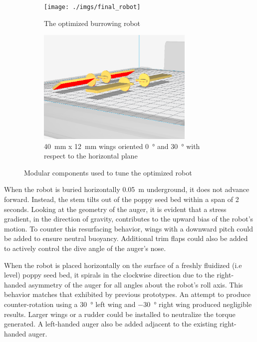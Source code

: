 \documentclass[letterpaper, 11 pt]{article}
\begin{document}
\begin{figure}[H]
\centering
\begin{subfigure}{.5\textwidth}
	\centering
	\texttt{[image: ./imgs/final\_robot]}
	\caption{The optimized burrowing robot}
	\label{fig:final_robot}
\end{subfigure}%
\begin{subfigure}{.5\textwidth}
	\centering
	\includegraphics[height=5.5cm]{./imgs/wings}
	\caption{\SI{40}{\milli\m} x \SI{12}{\milli\m} wings oriented \SI{0}{\degree} and \SI{30}{\degree} with respect to the horizontal plane}
	\label{fig:wings}
\end{subfigure}
\caption{Modular components used to tune the optimized robot}
\label{fig:final_testing}
\end{figure} 

When the robot is buried horizontally \SI{0.05}{\m} underground, it does not advance forward. Instead, the stem tilts out of the poppy seed bed within a span of 2 seconds. Looking at the geometry of the auger, it is evident that a stress gradient, in the direction of gravity, contributes to the upward bias of the robot's motion. To counter this resurfacing behavior, wings with a downward pitch could be added to ensure neutral buoyancy. Additional trim flaps could also be added to actively control the dive angle of the auger's nose. 
 
When the robot is placed horizontally on the surface of a freshly fluidized (i.e level) poppy seed bed, it spirals in the clockwise direction due to the right-handed asymmetry of the auger for all angles about the robot's roll axis. This behavior matches that exhibited by previous prototypes. An attempt to produce counter-rotation using a \SI{30}{\degree} left wing  and \SI{-30}{\degree} right wing produced negligible results. Larger wings or a rudder could be installed to neutralize the torque generated. A left-handed auger also be added adjacent to the existing right-handed auger. 
 
\end{document}

